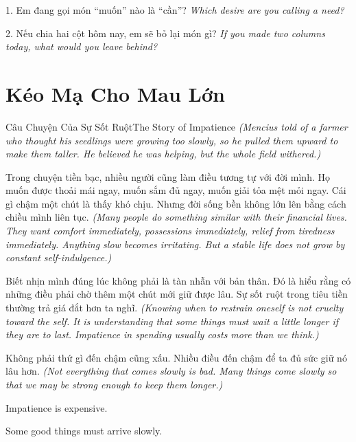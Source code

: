 \begin{tuhocnhanh}
1. Em đang gọi món ``muốn'' nào là ``cần''? \textit{Which desire are you calling a need?}

2. Nếu chia hai cột hôm nay, em sẽ bỏ lại món gì? \textit{If you made two columns today, what would you leave behind?}
\end{tuhocnhanh}
\ngancach

\section{Kéo Mạ Cho Mau Lớn}
\begin{truyen}{Câu Chuyện Của Sự Sốt Ruột}{The Story of Impatience}
\textit{(Mencius told of a farmer who thought his seedlings were growing too slowly, so he pulled them upward to make them taller. He believed he was helping, but the whole field withered.)}

Trong chuyện tiền bạc, nhiều người cũng làm điều tương tự với đời mình. Họ muốn được thoải mái ngay, muốn sắm đủ ngay, muốn giải tỏa mệt mỏi ngay. Cái gì chậm một chút là thấy khó chịu. Nhưng đời sống bền không lớn lên bằng cách chiều mình liên tục.
\textit{(Many people do something similar with their financial lives. They want comfort immediately, possessions immediately, relief from tiredness immediately. Anything slow becomes irritating. But a stable life does not grow by constant self-indulgence.)}

Biết nhịn mình đúng lúc không phải là tàn nhẫn với bản thân. Đó là hiểu rằng có những điều phải chờ thêm một chút mới giữ được lâu. Sự sốt ruột trong tiêu tiền thường trả giá đắt hơn ta nghĩ.
\textit{(Knowing when to restrain oneself is not cruelty toward the self. It is understanding that some things must wait a little longer if they are to last. Impatience in spending usually costs more than we think.)}
\end{truyen}

\begin{baihoc}
Không phải thứ gì đến chậm cũng xấu. Nhiều điều đến chậm để ta đủ sức giữ nó lâu hơn.
\textit{(Not everything that comes slowly is bad. Many things come slowly so that we may be strong enough to keep them longer.)}
\end{baihoc}

\begin{ghinhoanh}
Impatience is expensive.

Some good things must arrive slowly.
\end{ghinhoanh}

